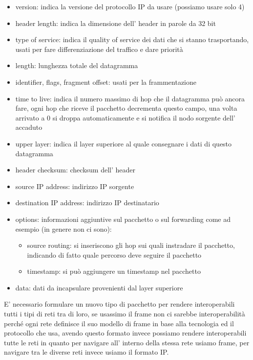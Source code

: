 \begin{itemize}
    \item version: indica la versione del protocollo IP da usare (possiamo usare solo 4)
    \item header length: indica la dimensione dell' header in parole da 32 bit
    \item type of service: indica il quality of service dei dati che si stanno trasportando, usati per fare differenziazione del traffico e dare priorità
    \item length: lunghezza totale del datagramma
    \item identifier, flags, fragment offset: usati per la frammentazione
    \item time to live: indica il numero massimo di hop che il datagramma può ancora fare, ogni hop che riceve il pacchetto decrementa questo campo, una volta arrivato a 0 si droppa automaticamente e si notifica il nodo sorgente dell' accaduto 
    \item upper layer: indica il layer superiore al quale consegnare i dati di questo datagramma
    \item header checksum: checksum dell' header
    \item source IP address: indirizzo IP sorgente
    \item destination IP address: indirizzo IP destinatario
    \item options: informazioni aggiuntive sul pacchetto o sul forwarding come ad esempio (in genere non ci sono):
    \begin{itemize}
        \item source routing: si inseriscono gli hop sui quali instradare il pacchetto, indicando di fatto quale percorso deve seguire il pacchetto
        \item timestamp: si può aggiungere un timestamp nel pacchetto
    \end{itemize}
    \item data: dati da incapsulare provenienti dal layer superiore
\end{itemize}
E' necessario formulare un nuovo tipo di pacchetto per rendere interoperabili tutti i tipi di reti tra di loro, se usassimo il frame non ci sarebbe interoperabilità perché ogni rete definisce il suo modello di frame in base alla tecnologia ed il protocollo che usa, avendo questo formato invece possiamo rendere interoperabili tutte le reti in quanto per navigare all' interno della stessa rete usiamo frame, per navigare tra le diverse reti invece usiamo il formato IP.

